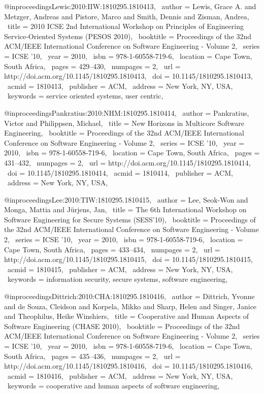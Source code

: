 @inproceedings{Lewis:2010:IIW:1810295.1810413,
 author = {Lewis, Grace A. and Metzger, Andreas and Pistore, Marco and Smith, Dennis and Zisman, Andrea},
 title = {2010 ICSE 2nd International Workshop on Principles of Engineering Service-Oriented Systems (PESOS 2010)},
 booktitle = {Proceedings of the 32nd ACM/IEEE International Conference on Software Engineering - Volume 2},
 series = {ICSE '10},
 year = {2010},
 isbn = {978-1-60558-719-6},
 location = {Cape Town, South Africa},
 pages = {429--430},
 numpages = {2},
 url = {http://doi.acm.org/10.1145/1810295.1810413},
 doi = {10.1145/1810295.1810413},
 acmid = {1810413},
 publisher = {ACM},
 address = {New York, NY, USA},
 keywords = {service oriented systems, user centric},
} 

@inproceedings{Pankratius:2010:NHM:1810295.1810414,
 author = {Pankratius, Victor and Philippsen, Michael},
 title = {New Horizons in Multicore Software Engineering},
 booktitle = {Proceedings of the 32nd ACM/IEEE International Conference on Software Engineering - Volume 2},
 series = {ICSE '10},
 year = {2010},
 isbn = {978-1-60558-719-6},
 location = {Cape Town, South Africa},
 pages = {431--432},
 numpages = {2},
 url = {http://doi.acm.org/10.1145/1810295.1810414},
 doi = {10.1145/1810295.1810414},
 acmid = {1810414},
 publisher = {ACM},
 address = {New York, NY, USA},
} 

@inproceedings{Lee:2010:TIW:1810295.1810415,
 author = {Lee, Seok-Won and Monga, Mattia and J\"{u}rjens, Jan},
 title = {The 6th International Workshop on Software Engineering for Secure Systems (SESS'10)},
 booktitle = {Proceedings of the 32nd ACM/IEEE International Conference on Software Engineering - Volume 2},
 series = {ICSE '10},
 year = {2010},
 isbn = {978-1-60558-719-6},
 location = {Cape Town, South Africa},
 pages = {433--434},
 numpages = {2},
 url = {http://doi.acm.org/10.1145/1810295.1810415},
 doi = {10.1145/1810295.1810415},
 acmid = {1810415},
 publisher = {ACM},
 address = {New York, NY, USA},
 keywords = {information security, secure systems, software engineering},
} 

@inproceedings{Dittrich:2010:CHA:1810295.1810416,
 author = {Dittrich, Yvonne and de Souza, Cleidson and Korpela, Mikko and Sharp, Helen and Singer, Janice and Theophilus, Heike Winshiers},
 title = {Cooperative and Human Aspects of Software Engineering (CHASE 2010)},
 booktitle = {Proceedings of the 32nd ACM/IEEE International Conference on Software Engineering - Volume 2},
 series = {ICSE '10},
 year = {2010},
 isbn = {978-1-60558-719-6},
 location = {Cape Town, South Africa},
 pages = {435--436},
 numpages = {2},
 url = {http://doi.acm.org/10.1145/1810295.1810416},
 doi = {10.1145/1810295.1810416},
 acmid = {1810416},
 publisher = {ACM},
 address = {New York, NY, USA},
 keywords = {cooperative and human aspects of software engineering},
} 

